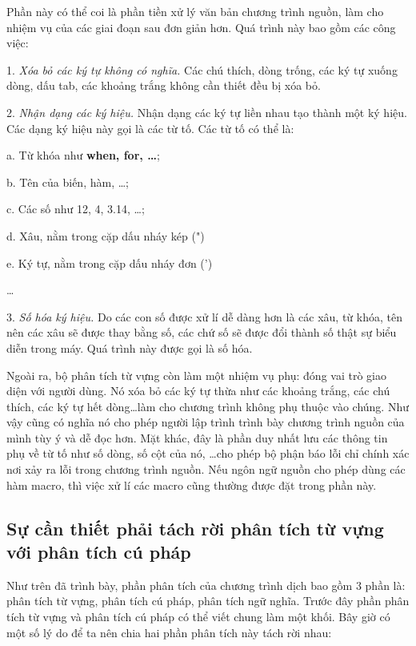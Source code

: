 \vspace{1cm}


Phần này có thể coi là phần tiền xử lý văn bản chương trình nguồn, làm cho nhiệm vụ của các giai đoạn sau đơn giản hơn. Quá trình này bao gồm các công việc:

1. {\itshape Xóa bỏ các ký tự không có nghĩa.} Các chú thích, dòng trống, các ký tự xuống dòng, dấu tab, các khoảng trắng không cần thiết đều bị xóa bỏ.

2. {\itshape Nhận dạng các ký hiệu.} Nhận dạng các ký tự liền nhau tạo thành một ký hiệu. Các dạng ký hiệu này gọi là các từ tố. Các từ tố có thể là:

a. Từ khóa như \textbf{when, for, \dots};

b. Tên của biến, hàm, \dots;

c. Các số như 12, 4, 3.14, \dots;

d. Xâu, nằm trong cặp dấu nháy kép (")

e. Ký tự, nằm trong cặp dấu nháy đơn (')

\dots

3. {\itshape Số hóa ký hiệu.} Do các con số được xử lí dễ dàng hơn là các xâu, từ khóa, tên nên các xâu sẽ được thay bằng số, các chứ số sẽ được đổi thành số thật sự biểu diễn trong máy. Quá trình này được gọi là số hóa.

Ngoài ra, bộ phân tích từ vựng còn làm một nhiệm vụ phụ: đóng vai trò giao diện với người dùng. Nó xóa bỏ các ký tự thừa như các khoảng trắng, các chú thích, các ký tự hết dòng\dots\space làm cho chương trình không phụ thuộc vào chúng. Như vậy cũng có nghĩa nó cho phép người lập trình trình bày chương trình nguồn của mình tùy ý và dễ đọc hơn. Mặt khác, đây là phần duy nhất lưu các thông tin phụ về từ tố như số dòng, số cột của nó, \dots\space cho phép bộ phận báo lỗi chỉ chính xác nơi xảy ra lỗi trong chương trình nguồn. Nếu ngôn ngữ nguồn cho phép dùng các hàm macro, thì việc xử lí các macro cũng thường được đặt trong phần này.

\subsection{Sự cần thiết phải tách rời phân tích từ vựng với phân tích cú pháp}
Như trên đã trình bày, phần phân tích của chương trình dịch bao gồm 3 phần là: phân tích từ vựng, phân tích cú pháp, phân tích ngữ nghĩa. Trước đây phần phân tích từ vựng và phân tích cú pháp có thể viết chung làm một khối. Bây giờ có một số lý do để ta nên chia hai phần phân tích này tách rời nhau:


